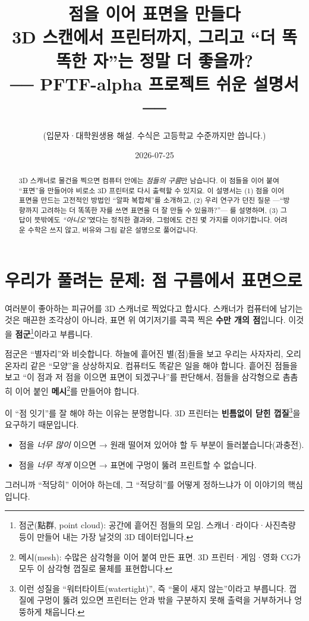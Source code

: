 \documentclass[11pt]{article}
\title{\textbf{점을 이어 표면을 만들다}\\[4pt]
\large 3D 스캔에서 프린터까지, 그리고 ``더 똑똑한 자''는 정말 더 좋을까?\\[6pt]
\normalsize ── PFTF-alpha 프로젝트 쉬운 설명서 ──}
\author{\small (입문자·대학원생용 해설. 수식은 고등학교 수준까지만 씁니다.)}
\date{2026-07-25}
\begin{document}
\maketitle

\begin{abstract}
\noindent
3D 스캐너로 물건을 찍으면 컴퓨터 안에는 \emph{점들의 구름}만 남습니다. 이 점들을
이어 붙여 ``표면''을 만들어야 비로소 3D 프린터로 다시 출력할 수 있지요. 이 설명서는
(1) 점을 이어 표면을 만드는 고전적인 방법인 ``알파 복합체''를 소개하고,
(2) 우리 연구가 던진 질문 ---``방향까지 고려하는 더 똑똑한 자를 쓰면 표면을 더 잘
만들 수 있을까?''--- 를 설명하며,
(3) 그 답이 뜻밖에도 \emph{``아니오''}였다는 정직한 결과와, 그럼에도 건진 몇 가지를
이야기합니다. 어려운 수학은 쓰지 않고, 비유와 그림 같은 설명으로 풀어갑니다.
\end{abstract}

\section{우리가 풀려는 문제: 점 구름에서 표면으로}

여러분이 좋아하는 피규어를 3D 스캐너로 찍었다고 합시다. 스캐너가 컴퓨터에 남기는
것은 매끈한 조각상이 아니라, 표면 위 여기저기를 콕콕 찍은 \textbf{수만 개의 점}입니다.
이것을 \textbf{점군}\footnote{점군(點群, point cloud): 공간에 흩어진 점들의 모임.
스캐너·라이다·사진측량 등이 만들어 내는 가장 날것의 3D 데이터입니다.}이라고 부릅니다.

점군은 ``별자리''와 비슷합니다. 하늘에 흩어진 별(점)들을 보고 우리는 사자자리, 오리온자리
같은 ``모양''을 상상하지요. 컴퓨터도 똑같은 일을 해야 합니다. 흩어진 점들을 보고
``이 점과 저 점을 이으면 표면이 되겠구나''를 판단해서, 점들을 삼각형으로 촘촘히 이어 붙인
\textbf{메시}\footnote{메시(mesh): 수많은 삼각형을 이어 붙여 만든 표면. 3D 프린터·게임·영화
CG가 모두 이 삼각형 껍질로 물체를 표현합니다.}를 만들어야 합니다.

이 ``점 잇기''를 잘 해야 하는 이유는 분명합니다. 3D 프린터는 \textbf{빈틈없이 닫힌
껍질}\footnote{이런 성질을 ``워터타이트(watertight)'', 즉 ``물이 새지 않는''이라고
부릅니다. 껍질에 구멍이 뚫려 있으면 프린터는 안과 밖을 구분하지 못해 출력을 거부하거나
엉뚱하게 채웁니다.}을 요구하기 때문입니다.
\begin{itemize}[leftmargin=1.4em]
  \item 점을 \emph{너무 많이} 이으면 → 원래 떨어져 있어야 할 두 부분이 들러붙습니다(과충전).
  \item 점을 \emph{너무 적게} 이으면 → 표면에 구멍이 뚫려 프린트할 수 없습니다.
\end{itemize}
그러니까 ``적당히'' 이어야 하는데, 그 ``적당히''를 어떻게 정하느냐가 이 이야기의
핵심입니다.
\end{document}
